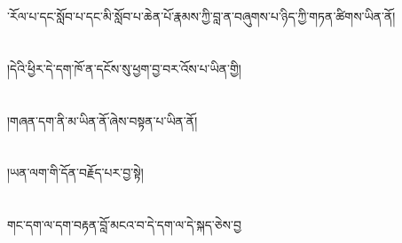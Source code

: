 ་རོལ་པ་དང་སློབ་པ་དང་མི་སློབ་པ་ཆེན་པོ་རྣམས་ཀྱི་བླ་ན་བཞུགས་པ་ཉིད་ཀྱི་གཏན་ཚིགས་ཡིན་ནོ།\chapter{ }།དེའི་ཕྱིར་དེ་དག་ཁོ་ན་དངོས་སུ་ཕྱག་བྱ་བར་འོས་པ་ཡིན་གྱི།\chapter{ }།གཞན་དག་ནི་མ་ཡིན་ནོ་ཞེས་བསྟན་པ་ཡིན་ནོ།\chapter{ }།ཡན་ལག་གི་དོན་བརྗོད་པར་བྱ་སྟེ།\chapter{ }གང་དག་ལ་དག་བརྟན་བློ་མངའ་བ་དེ་དག་ལ་དེ་སྐད་ཅེས་བྱ